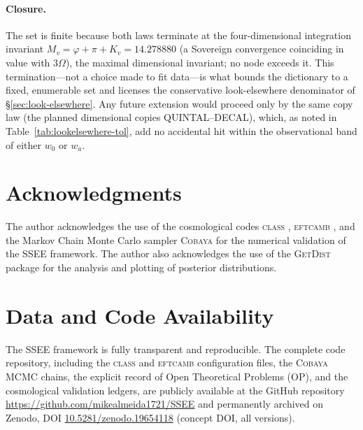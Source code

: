 \documentclass[aps,prd,preprint,amsmath,amssymb,nofootinbib,longbibliography]{revtex4-2}
\begin{document}
\paragraph{Closure.} The set is finite because both laws terminate at the
four-dimensional integration invariant $M_v=\varphi+\pi+K_v=14.278880$ (a Sovereign
convergence coinciding in value with $3\Omega$), the maximal dimensional
invariant; no node exceeds it. This termination---not a
choice made to fit data---is what bounds the dictionary to a fixed, enumerable
set and licenses the conservative look-elsewhere denominator of
\S\ref{sec:look-elsewhere}. Any future extension would proceed only by the same
copy law (the planned dimensional copies QUINTAL--DECAL), which, as noted in
Table~\ref{tab:lookelsewhere-tol}, add no accidental hit within the
observational band of either $w_0$ or $w_a$.

\section*{Acknowledgments}
The author acknowledges the use of the cosmological codes \textsc{class} \citep{Blas2011}, \textsc{eftcamb} \citep{Hu2014}, and the Markov Chain Monte Carlo sampler \textsc{Cobaya} \citep{Torrado2021} for the numerical validation of the SSEE framework. The author also acknowledges the use of the \textsc{GetDist} package \citep{Lewis2019} for the analysis and plotting of posterior distributions.

\section*{Data and Code Availability}
The SSEE framework is fully transparent and reproducible. The complete code repository, including the \textsc{class} and \textsc{eftcamb} configuration files, the \textsc{Cobaya} MCMC chains, the explicit record of Open Theoretical Problems (OP), and the cosmological validation ledgers, are publicly available at the GitHub repository \url{https://github.com/mikealmeida1721/SSEE} and permanently archived on Zenodo, DOI \href{https://doi.org/10.5281/zenodo.19654118}{10.5281/zenodo.19654118} (concept DOI, all versions).

\clearpage


\end{document}

